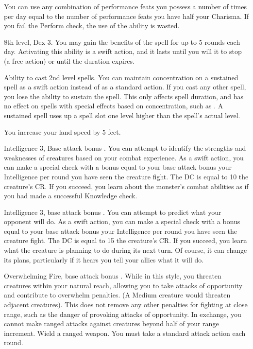 You can use any combination of performance feats you possess a number of times per day equal to the number of performance feats you have \add half your Charisma. If you fail the Perform check, the use of the ability is wasted.

\featpre 8th level, Dex 3.
\featben You may gain the benefits of the  spell for up to 5 rounds each day. Activating this ability is a swift action, and it lasts until you will it to stop (a free action) or until the duration expires.

\featpre Ability to cast 2nd level spells.
\featben You can maintain concentration on a sustained spell as a swift action instead of as a standard action. If you cast any other spell, you lose the ability to sustain the spell. This only affects spell duration, and has no effect on spells with special effects based on concentration, such as . A sustained spell uses up a spell slot one level higher than the spell's actual level.

 You increase your land speed by 5 feet.

 Intelligence 3, Base attack bonus .
 You can attempt to identify the strengths and weaknesses of creatures based on your combat experience. As a swift action, you can make a special check with a bonus equal to your base attack bonus \add your Intelligence  per round you have seen the creature fight. The DC is equal to 10 \add the creature's CR. If you succeed, you learn about the monster's combat abilities as if you had made a successful Knowledge check.

 Intelligence 3, base attack bonus .
 You can attempt to predict what your opponent will do. As a swift action, you can make a special check with a bonus equal to your base attack bonus \add your Intelligence  per round you have seen the creature fight. The DC is equal to 15 \add the creature's CR. If you succeed, you learn what the creature is planning to do during its next turn. Of course, it can change its plans, particularly if it hears you tell your allies what it will do.

\featpre Overwhelming Fire, base attack bonus .
\featben While in this style, you threaten creatures within your natural reach, allowing you to take attacks of opportunity and contribute to overwhelm penalties. (A Medium creature would threaten adjacent creatures). This does not remove any other penalties for fighting at close range, such as the danger of provoking attacks of opportunity. In exchange, you cannot make ranged attacks against creatures beyond half of your range increment.
\stylereq Wield a ranged weapon. You must take a standard attack action each round.

